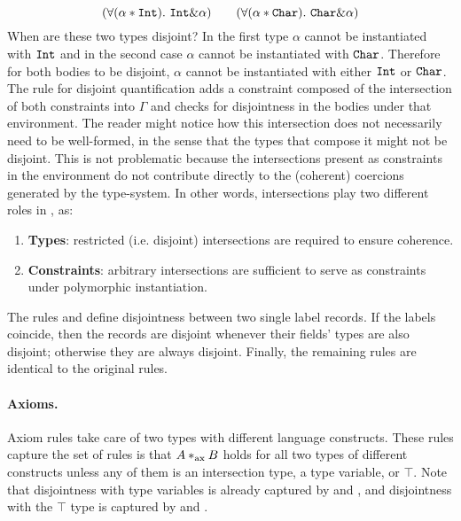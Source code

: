 \[ (\forall (\alpha * \texttt{Int}).~\texttt{Int} \& \alpha) \qquad 
(\forall (\alpha * \texttt{Char}). ~\texttt{Char} \& \alpha) \]
When are these two types disjoint?
In the first type $\alpha$ cannot be instantiated with $\texttt{Int}$ and in
the second case $\alpha$ cannot be instantiated with $\texttt{Char}$.
Therefore for both bodies to be disjoint, $\alpha$ cannot be instantiated with either $\texttt{Int}$ 
or $\texttt{Char}$. 
The rule for disjoint quantification adds a constraint composed of the intersection of both constraints into $\Gamma$ and checks for 
disjointness in the bodies under that environment.
The reader might notice how this intersection does not necessarily need to be well-formed,
in the sense that the types that compose it might not be disjoint.
This is not problematic because the intersections present as constraints in the environment
do not contribute directly to the (coherent) coercions generated by the type-system.
In other words, intersections play two different roles in \name, as:
\begin{enumerate}
\item \textbf{Types}: restricted (i.e. disjoint) intersections are required to ensure coherence.
\item \textbf{Constraints}: arbitrary intersections are sufficient to serve as constraints under 
polymorphic instantiation. 
\end{enumerate}

The rules  and  define disjointness between
two single label records.
If the labels coincide, then the records are disjoint whenever their fields' types are also disjoint;
otherwise they are always disjoint.
Finally, the remaining rules are identical to the original rules. 

\paragraph{Axioms.} Axiom rules take care of two types with different language constructs.
These rules capture the set of rules is that $A *_\textnormal{ax} B$ holds for all 
two types of different constructs unless any of them is an intersection type, a type variable,
or $\top$.
Note that disjointness with type variables is already captured by  and 
, and disjointness with the $\top$ type is captured by 
{} and {}.

